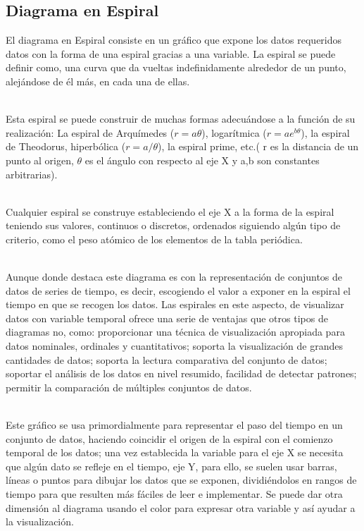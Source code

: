\documentclass{article}\usepackage[]{graphicx}\usepackage[]{color}
\begin{document}
\subsection{Diagrama en Espiral}
El diagrama en Espiral consiste en un gr\'afico que expone los datos requeridos datos con la forma de una espiral gracias a una variable. La espiral se puede definir como, una curva que da vueltas indefinidamente alrededor de un punto, alej\'andose de \'el m\'as, en cada una de ellas\cite{rae}.~\\~\par
Esta espiral se puede construir de muchas formas adecu\'andose a la funci\'on de su realizaci\'on: La espiral de Arqu\'imedes ($r = a\theta$)\cite{mat_arqui}, logar\'itmica ($r=a e^{b\theta}$)\cite{mat_log}, la espiral de Theodorus\cite{mat_theo}, hiperb\'olica ($r=  a/\theta$)\cite{mat_hiper}, la espiral prime\cite{mat_prime}, etc.( r es la distancia de un punto al origen, $\theta$ es el \'angulo con respecto al eje X y a,b son constantes arbitrarias).~\\~\par
Cualquier espiral se construye estableciendo el eje X a la forma de la espiral teniendo sus valores, continuos o discretos, ordenados siguiendo alg\'un tipo de criterio, como el peso at\'omico de los elementos de la tabla peri\'odica\cite{tipos_espiral}.~\\~\par
Aunque donde destaca este diagrama es con la representaci\'on de conjuntos de datos de series de tiempo, es decir, escogiendo el valor a exponer en la espiral el tiempo en que se recogen los datos. Las espirales en este aspecto, de visualizar datos con variable temporal ofrece una serie de ventajas que otros tipos de diagramas no, como: proporcionar una t\'ecnica de visualizaci\'on apropiada para datos nominales, ordinales y cuantitativos; soporta la visualizaci\'on de grandes cantidades de datos; soporta la lectura comparativa del conjunto de datos; soportar el an\'alisis de los datos en nivel resumido, facilidad de detectar patrones; permitir la comparaci\'on de m\'ultiples conjuntos de datos\cite{espiral}.~\\~\par
Este gr\'afico se usa primordialmente para representar el paso del tiempo en un conjunto de datos, haciendo coincidir el origen de la espiral con el comienzo temporal de los datos; una vez establecida la variable para el eje X se necesita que alg\'un dato se refleje en el tiempo, eje Y, para ello, se suelen usar barras, l\'ineas o puntos para dibujar los datos que se exponen, dividi\'endolos en rangos de tiempo para que resulten m\'as f\'aciles de leer e implementar. Se puede dar otra dimensi\'on al diagrama usando el color para expresar otra variable y as\'i ayudar a la visualizaci\'on.~\\~\par
\end{document}
